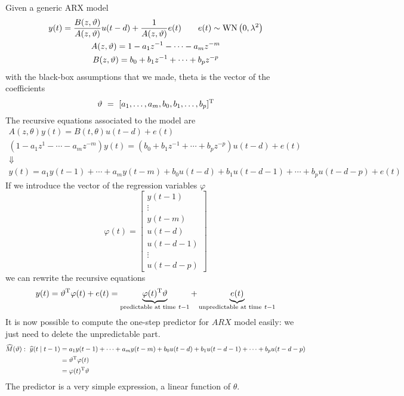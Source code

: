 Given a generic ARX model
\begin{gather*}
y(t) =\frac{B(z,\vartheta)}{A(z,\vartheta)} u(t-d) +\frac{1}{A(z,\vartheta)} e(t) \qquad e(t) \sim \operatorname{WN}\left(0,\lambda ^{2}\right)\\
A(z,\vartheta) =1-a_{1} z^{-1} -\cdots -a_{m} z^{-m}\\
B(z,\vartheta) =b_{0} +b_{1} z^{-1} +\cdots +b_{p} z^{-p}
\end{gather*}
with the black-box assumptions that we made, theta is the vector of the coefficients
\begin{equation*}
\vartheta \ =\ [ a_{1},\ldots,a_{m},b_{0},b_{1},\ldots,b_{p}]^{\mathrm{T}}
\end{equation*}
The recursive equations associated to the model are
\begin{gather*}
A(z,\theta) y(t) =B(t,\theta) u(t-d) +e(t)\\
\left(1-a_{1} z^{1} -\cdots -a_{m} z^{-m}\right) y(t) =\left(b_{0} +b_{1} z^{-1} +\cdots +b_{p} z^{-p}\right) u(t-d) +e(t)\\
\Downarrow \\
y(t) =a_{1} y(t-1) +\cdots +a_{m} y(t-m) +b_{0} u(t-d) +b_{1} u(t-d-1) +\cdots +b_{p} u(t-d-p) +e(t)
\end{gather*}
If we introduce the vector of the regression variables $ \varphi $
\begin{equation*}
\varphi (t) =\begin{bmatrix}
y(t-1)\\
\vdots\\
y(t-m)\\
u(t-d)\\
u(t-d-1)\\
\vdots\\
u(t-d-p)
\end{bmatrix}
\end{equation*}
we can rewrite the recursive equations
\begin{equation*}
y(t) =\vartheta ^{\mathrm{T}} \varphi (t) +e(t) =\underbrace{\varphi (t)^{\mathrm{T}} \vartheta }_{\text{predictable at time} \ t-1} +\underbrace{e(t)}_{\text{unpredictable at time} \ t-1}
\end{equation*}
It is now possible to compute the one-step predictor for $ ARX$ model easily: we just need to delete the unpredictable part.
\begin{align*}
\widehat{M}(\vartheta) :\ \widehat{y}(t\mid t-1) & =a_{1} y(t-1) +\cdots +a_{m} y(t-m) +b_{0} u(t-d) +b_{1} u(t-d-1) +\cdots +b_{p} u(t-d-p)\\
 & =\vartheta ^{\mathrm{T}} \varphi (t) \ \\
 & =\varphi (t)^{\mathrm{T}} \vartheta 
\end{align*}
The predictor is a very simple expression, a linear function of $ \theta $.


